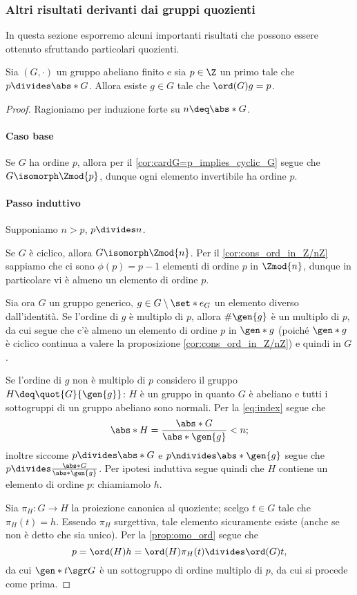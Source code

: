 \subsubsection{Altri risultati derivanti dai gruppi quozienti}
In questa sezione esporremo alcuni importanti risultati che possono essere ottenuto sfruttando particolari quozienti.

\begin{theorem}
    Sia $(G, \cdot)$ un gruppo abeliano finito e sia $p \in \Z$ un primo tale che $p \divides \abs*{G}$. 
    Allora esiste $g \in G$ tale che $\ord(G){g} = p$.
\end{theorem}
\begin{proof}
    Ragioniamo per induzione forte su $n \deq \abs*{G}$.
    \paragraph{Caso base}
    Se $G$ ha ordine $p$, allora per il \autoref{cor:cardG=p_implies_cyclic_G} segue che $G \isomorph \Zmod{p}$, dunque ogni elemento invertibile ha ordine $p$.

    \paragraph{Passo induttivo} Supponiamo $n > p$,  $p \divides n$.

    Se $G$ è ciclico, allora $G \isomorph \Zmod{n}$. Per il \autoref{cor:cons_ord_in_Z/nZ} sappiamo che ci sono $\phi(p) = p-1$ elementi di ordine $p$ in $\Zmod{n}$, dunque in particolare vi è almeno un elemento di ordine $p$.

    Sia ora $G$ un gruppo generico, $g \in G \setminus \set*{e_G}$ un elemento diverso dall'identità. 
    Se l'ordine di $g$ è multiplo di $p$, allora $\#\gen{g}$ è un multiplo di  $p$, da cui segue che c'è almeno un elemento di ordine $p$ in $\gen*{g}$ 
    (poiché $\gen*{g}$ è ciclico continua a valere la proposizione \autoref{cor:cons_ord_in_Z/nZ}) e quindi in $G$.

    Se l'ordine di $g$ non è multiplo di $p$ considero il gruppo $H \deq \quot{G}{\gen{g}}$: 
    $H$ è un gruppo in quanto $G$ è abeliano e tutti i sottogruppi di un gruppo abeliano sono normali. 
    Per la \eqref{eq:index} segue che \[
        \abs*{H} = \frac{\abs*{G}}{\abs*{\gen{g}}} < n;
    \] inoltre siccome $p \divides \abs*{G}$ e $p \ndivides \abs*{\gen{g}}$
    segue che $p \divides \frac{\abs*{G}}{\abs*{\gen{g}}}$. Per ipotesi induttiva segue quindi che $H$ contiene un elemento di ordine $p$: chiamiamolo $h$.

    Sia $\pi_H : G \to H$ la proiezione canonica al quoziente; scelgo $t \in G$ tale che $\pi_H(t) = h$.
    Essendo $\pi_H$ surgettiva, tale elemento sicuramente esiste (anche se non è detto che sia unico). Per la \autoref{prop:omo_ord} segue che  \[
        p = \ord(H){h} = \ord(H){\pi_H(t)} \divides \ord(G){t}, 
    \] da cui $\gen*{t} \sgr G$ è un sottogruppo di ordine multiplo di $p$, da cui si procede come prima.    
\end{proof}


